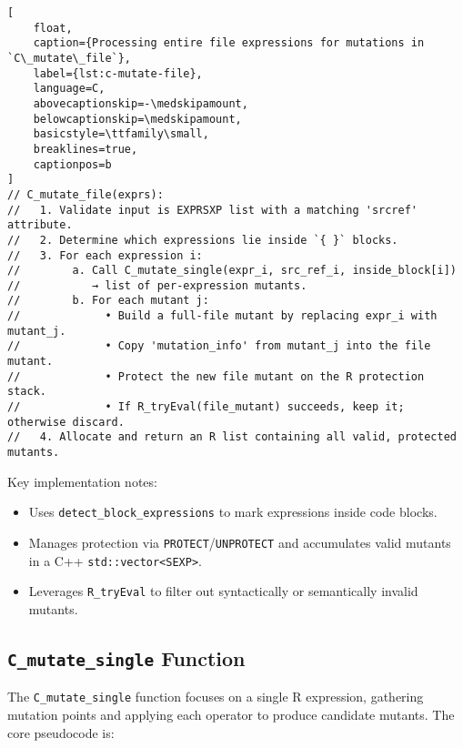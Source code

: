 \begin{lstlisting}[
    float,
    caption={Processing entire file expressions for mutations in `C\_mutate\_file`},
    label={lst:c-mutate-file},
    language=C,
    abovecaptionskip=-\medskipamount,
    belowcaptionskip=\medskipamount,
    basicstyle=\ttfamily\small,
    breaklines=true,
    captionpos=b
]
// C_mutate_file(exprs):
//   1. Validate input is EXPRSXP list with a matching 'srcref' attribute.
//   2. Determine which expressions lie inside `{ }` blocks.
//   3. For each expression i:
//        a. Call C_mutate_single(expr_i, src_ref_i, inside_block[i]) 
//           → list of per-expression mutants.
//        b. For each mutant j:
//             • Build a full-file mutant by replacing expr_i with mutant_j.
//             • Copy 'mutation_info' from mutant_j into the file mutant.
//             • Protect the new file mutant on the R protection stack.
//             • If R_tryEval(file_mutant) succeeds, keep it; otherwise discard.
//   4. Allocate and return an R list containing all valid, protected mutants.
\end{lstlisting}


Key implementation notes:
\begin{itemize}
  \item Uses \texttt{detect\_block\_expressions} to mark expressions inside code blocks.
  \item Manages protection via \texttt{PROTECT}/\texttt{UNPROTECT} and accumulates valid mutants in a C++ \texttt{std::vector<SEXP>}.
  \item Leverages \texttt{R\_tryEval} to filter out syntactically or semantically invalid mutants.
\end{itemize}

\subsection{\texttt{C\_mutate\_single} Function}

The \texttt{C\_mutate\_single} function focuses on a single R expression, gathering mutation points and applying each operator to produce candidate mutants.  The core pseudocode is:

